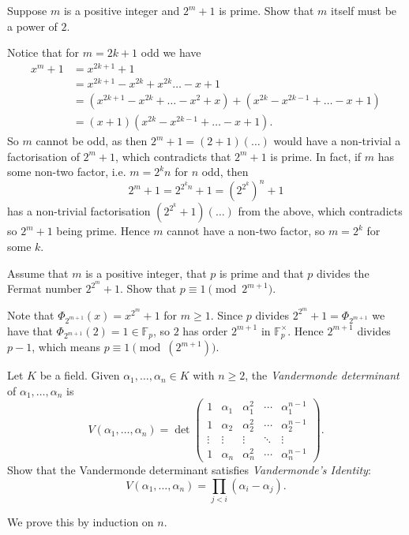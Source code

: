 \documentclass[a4paper, 11pt]{homework}
\newcommand{\F}{\mathbb{F}}
\begin{document}
\begin{questions}
	\question{} Suppose \(m\) is a positive integer and \(2^m+1\) is prime. Show that \(m\) itself must be a power
	of \(2\).
	\begin{solution}
    Notice that for \(m = 2k+1\) odd we have
		\begin{align*}
			x^m + 1 & = x^{2k+1} + 1                             \\
			        & = x^{2k+1} - x^{2k} + x^{2k} \dots - x + 1 \\
              & = (x^{2k+1} - x^{2k} + \dots - x^2 + x) + (x^{2k} - x^{2k-1} + \dots - x + 1) \\
              & = (x+1)(x^{2k} - x^{2k-1} + \dots - x + 1).
		\end{align*}
    So \(m\) cannot be odd, as then \(2^m+1 = (2+1)(\dots)\) would have a non-trivial a factorisation of \(2^m+1\),
    which contradicts that \(2^m+1\) is prime. In fact, if \(m\) has some non-two factor, i.e. \(m = 2^kn\) for
    \(n\) odd, then
    \[2^m+1 = 2^{2^kn} + 1 = \left(2^{2^k}\right)^n + 1\]
    has a non-trivial factorisation \((2^{2^k}+1)(\dots)\) from the above, which contradicts so \(2^m+1\) being
    prime. Hence \(m\) cannot have a non-two factor, so \(m = 2^k\) for some \(k\).
  \end{solution}

	\question{} Assume that \(m\) is a positive integer, that \(p\) is prime and that \(p\) divides the Fermat
	number \(2^{2^m}+1\). Show that \(p \equiv 1\pmod{2^{m+1}}\).
	\begin{solution}
    Note that \(\Phi_{2^{m+1}}(x) = x^{2^m} + 1\) for \(m \ge 1\).  Since \(p\) divides \(2^{2^m}+1 = \Phi_{2^
    {m+1 }}\) we have that \(\Phi_{2^{m+1}}(2) = 1 \in \F_p\), so \(2\) has order \(2^{m+1}\) in \(\F_p^\times\).
    Hence \(2^{m+1}\) divides \(p-1\), which means \(p \equiv 1 \pmod (2^{m+1})\).
	\end{solution}

  \newpage
	\question{} Let \(K\) be a field. Given \(\alpha_1,\dots,\alpha_n \in K\) with \(n \ge 2\), the
	\textit{Vandermonde determinant} of \(\alpha_1,\dots,\alpha_n\) is
	\[
		V(\alpha_1,\dots,\alpha_n) = \det\begin{pmatrix}
			1      & \alpha_1 & \alpha_1^2 & \cdots & \alpha_1^{n-1} \\
			1      & \alpha_2 & \alpha_2^2 & \cdots & \alpha_2^{n-1} \\
			\vdots & \vdots   & \vdots     & \ddots & \vdots         \\
			1      & \alpha_n & \alpha_n^2 & \cdots & \alpha_n^{n-1}
		\end{pmatrix}.
	\]
	Show that the Vandermonde determinant satisfies \textit{Vandermonde's Identity}:
	\[
		V(\alpha_1,\dots,\alpha_n) = \prod_{j < i}(\alpha_i - \alpha_j).
	\]
	\begin{solution}
		We prove this by induction on \(n\).


\end{solution}
\end{questions}
\end{document}
